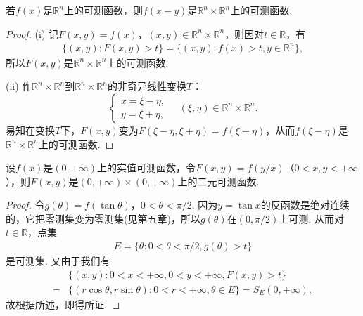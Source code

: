 \documentclass[../../main.tex]{subfiles}%
\begin{document}
\begin{example}
若\(f(x)\)是\(\mathbb{R}^{n}\)上的可测函数，则\(f(x - y)\)是\(\mathbb{R}^{n} \times \mathbb{R}^{n}\)上的可测函数.
\end{example}
\begin{proof}

(i) 记\(F(x, y) = f(x)\)，\((x, y) \in \mathbb{R}^{n} \times \mathbb{R}^{n}\)，则因对\(t \in \mathbb{R}\)，有
\begin{align*}
\{(x, y): F(x, y) > t\} = \{(x, y): f(x) > t, y \in \mathbb{R}^{n}\},
\end{align*}
所以\(F(x, y)\)是\(\mathbb{R}^{n} \times \mathbb{R}^{n}\)上的可测函数.

(ii) 作\(\mathbb{R}^{n} \times \mathbb{R}^{n}\)到\(\mathbb{R}^{n} \times \mathbb{R}^{n}\)的非奇异线性变换\(T\)：
\[
\begin{cases}
x = \xi - \eta, \\
y = \xi + \eta,
\end{cases}
\quad (\xi, \eta) \in \mathbb{R}^{n} \times \mathbb{R}^{n}.
\]
易知在变换\(T\)下，\(F(x, y)\)变为\(F(\xi - \eta, \xi + \eta) = f(\xi - \eta)\)，从而\(f(\xi - \eta)\)是\(\mathbb{R}^{n} \times \mathbb{R}^{n}\)上的可测函数.

\end{proof}

\begin{example}
设\(f(x)\)是\((0, +\infty)\)上的实值可测函数，令\(F(x, y) = f(y / x)\)（\(0 < x, y < +\infty\)），则\(F(x, y)\)是\((0, +\infty) \times (0, +\infty)\)上的二元可测函数.
\end{example}
\begin{proof}

令\(g(\theta) = f(\tan\theta)\)，\(0 < \theta < \pi / 2\). 因为\(y = \tan x\)的反函数是绝对连续的，它把零测集变为零测集(见第五章)，所以\(g(\theta)\)在\((0, \pi / 2)\)上可测. 从而对\(t \in \mathbb{R}\)，点集
\begin{align*}
E = \{\theta: 0 < \theta < \pi / 2, g(\theta) > t\}
\end{align*}
是可测集. 又由于我们有
\begin{align*}
&\{(x, y): 0 < x < +\infty, 0 < y < +\infty, F(x, y) > t\} \\
=&\{(r\cos\theta, r\sin\theta): 0 < r < +\infty, \theta \in E\} = S_{E}(0, +\infty),
\end{align*}
故根据所述，即得所证.

\end{proof}
\end{document}
